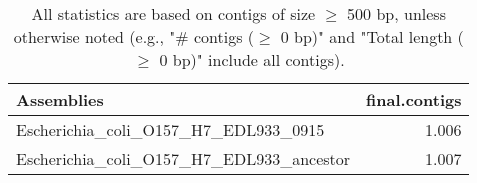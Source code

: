 \documentclass[12pt,a4paper]{article}
\begin{document}
\begin{table}[ht]
\begin{center}
\caption{All statistics are based on contigs of size $\geq$ 500 bp, unless otherwise noted (e.g., "\# contigs ($\geq$ 0 bp)" and "Total length ($\geq$ 0 bp)" include all contigs).}
\begin{tabular}{|l*{1}{|r}|}
\hline
Assemblies & final.contigs \\ \hline
Escherichia\_coli\_O157\_H7\_EDL933\_0915 & 1.006 \\ \hline
Escherichia\_coli\_O157\_H7\_EDL933\_ancestor & 1.007 \\ \hline
\end{tabular}
\end{center}
\end{table}
\end{document}
